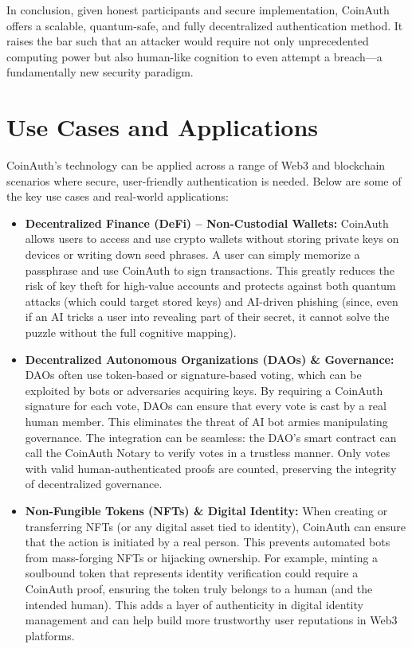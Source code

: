 \documentclass[10pt,letterpaper]{article}
\begin{document}
In conclusion, given honest participants and secure implementation, CoinAuth offers a scalable, quantum-safe, and fully decentralized authentication method. It raises the bar such that an attacker would require not only unprecedented computing power but also human-like cognition to even attempt a breach—a fundamentally new security paradigm.

\section{Use Cases and Applications}
CoinAuth’s technology can be applied across a range of Web3 and blockchain scenarios where secure, user-friendly authentication is needed. Below are some of the key use cases and real-world applications:

\begin{itemize}
    \item \textbf{Decentralized Finance (DeFi) – Non-Custodial Wallets:} CoinAuth allows users to access and use crypto wallets without storing private keys on devices or writing down seed phrases. A user can simply memorize a passphrase and use CoinAuth to sign transactions. This greatly reduces the risk of key theft for high-value accounts and protects against both quantum attacks (which could target stored keys) and AI-driven phishing (since, even if an AI tricks a user into revealing part of their secret, it cannot solve the puzzle without the full cognitive mapping).
    \item \textbf{Decentralized Autonomous Organizations (DAOs) \& Governance:} DAOs often use token-based or signature-based voting, which can be exploited by bots or adversaries acquiring keys. By requiring a CoinAuth signature for each vote, DAOs can ensure that every vote is cast by a real human member. This eliminates the threat of AI bot armies manipulating governance. The integration can be seamless: the DAO’s smart contract can call the CoinAuth Notary to verify votes in a trustless manner. Only votes with valid human-authenticated proofs are counted, preserving the integrity of decentralized governance.
    \item \textbf{Non-Fungible Tokens (NFTs) \& Digital Identity:} When creating or transferring NFTs (or any digital asset tied to identity), CoinAuth can ensure that the action is initiated by a real person. This prevents automated bots from mass-forging NFTs or hijacking ownership. For example, minting a soulbound token that represents identity verification could require a CoinAuth proof, ensuring the token truly belongs to a human (and the intended human). This adds a layer of authenticity in digital identity management and can help build more trustworthy user reputations in Web3 platforms.

\end{itemize}
\end{document}
